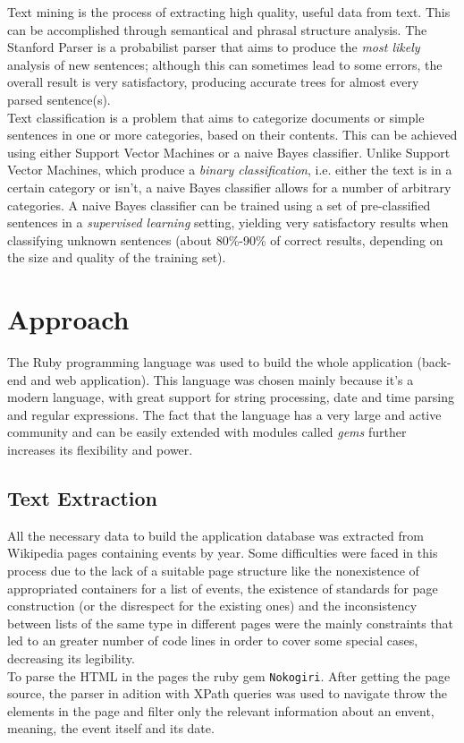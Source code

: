 \documentclass{llncs}
\begin{document}
Text mining is the process of extracting high quality, useful data from text. This can be accomplished through semantical and phrasal structure analysis. The Stanford Parser is a probabilist parser that aims to produce the \textit{most likely} analysis of new sentences; although this can sometimes lead to some errors, the overall result is very satisfactory, producing accurate trees for almost every parsed sentence(s).\\

Text classification is a problem that aims to categorize documents or simple sentences in one or more categories, based on their contents. This can be achieved using either Support Vector Machines or a naive Bayes classifier. Unlike Support Vector Machines, which produce a \textit{binary classification}, i.e. either the text is in a certain category or isn't, a naive Bayes classifier allows for a number of arbitrary categories. A naive Bayes classifier can be trained using a set of pre-classified sentences in a \textit{supervised learning} setting, yielding very satisfactory results when classifying unknown sentences (about 80\%-90\% of correct results, depending on the size and quality of the training set).

\section{Approach}
\label{sec:approach}

The Ruby programming language was used to build the whole application (back-end and web application). This language was chosen mainly because it's a modern language, with great support for string processing, date and time parsing and regular expressions. The fact that the language has a very large and active community and can be easily extended with modules called \textit{gems} further increases its flexibility and power.

\subsection{Text Extraction}
All the necessary data to build the application database was extracted from Wikipedia pages containing events by year.
Some difficulties were faced in this process due to the lack of a suitable page structure like the nonexistence of appropriated containers for a list of events, the existence of standards for page construction (or the disrespect for the existing ones) and the inconsistency between lists of the same type in different pages were the mainly constraints that led to an greater number of code lines in order to cover some special cases, decreasing its legibility.\\
To parse the HTML in the pages the ruby gem \verb!Nokogiri!. After getting the page source, the parser in adition with XPath queries was used to navigate throw the elements in the page and filter only the relevant information about an envent, meaning, the event itself and its date.
\end{document}
